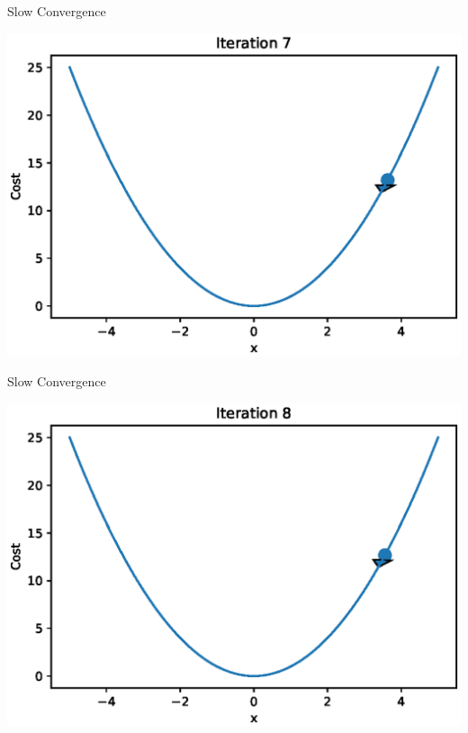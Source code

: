 \documentclass{beamer}
\begin{document}
\begin{frame}{Slow Convergence}
  \begin{center}
       \includegraphics[totalheight=6cm]{gradient-descent/undershooting-7.eps}
   \end{center}
\end{frame}

\begin{frame}{Slow Convergence}
  \begin{center}
       \includegraphics[totalheight=6cm]{gradient-descent/undershooting-8.eps}
   \end{center}
\end{frame}
\end{document}
